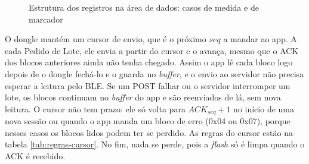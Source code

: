 \documentclass[
	12pt,
	article,			%
	oneside,
	a4paper,
	english,
	brazil				%
	]{abntex2}
\begin{document}
\begin{figure}[H]
	\centering
	\caption{Estrutura dos registros na área de dados: casos de medida e de marcador}
	\label{fig:registros-dados-bloco}
\end{figure}

O dongle mantém um cursor de envio, que é o próximo $seq$ a mandar ao app. A cada Pedido de Lote, ele envia a partir do cursor e o avança, mesmo que o ACK dos blocos anteriores ainda não tenha chegado.
Assim o app lê cada bloco logo depois de o dongle fechá-lo e o guarda no \textit{buffer}, e o envio ao servidor não precisa esperar a leitura pelo BLE. Se um POST falhar ou o servidor interromper um lote,
os blocos continuam no \textit{buffer} do app e são reenviados de lá, sem nova leitura. O cursor não tem prazo: ele só volta para $ACK_{seq} + 1$ no início de uma nova sessão ou quando o app manda um bloco
de erro (0x04 ou 0x07), porque nesses casos os blocos lidos podem ter se perdido. As regras do cursor estão na tabela \ref{tab:regras-cursor}. No fim, nada se perde, pois a \textit{flash} só é limpa quando
o ACK é recebido.
\end{document}
